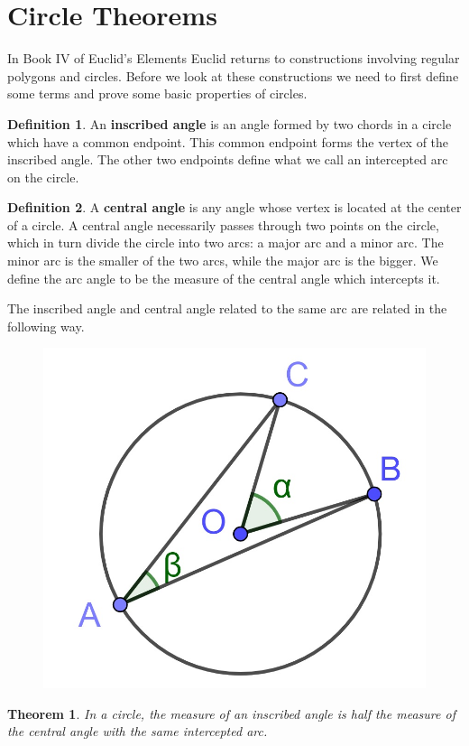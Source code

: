 \documentclass[
]{book}
\newtheorem{theorem}{Theorem}[chapter]
\theoremstyle{definition}
\newtheorem{definition}{Definition}[chapter]
\theoremstyle{definition}
\theoremstyle{definition}
\theoremstyle{definition}
\theoremstyle{remark}
\begin{document}
\hypertarget{circle-theorems}{%
\section{Circle Theorems}\label{circle-theorems}}

In Book IV of Euclid's Elements \citep{Heath1908_2} Euclid returns to constructions involving regular polygons and circles. Before we look at these constructions we need to first define some terms and prove some basic properties of circles.

\begin{definition}
An \textbf{inscribed angle} is an angle formed by two chords in a circle which have a common endpoint. This common endpoint forms the vertex of the inscribed angle. The other two endpoints define what we call an intercepted arc on the circle.
\end{definition}

\begin{definition}
A \textbf{central angle} is any angle whose vertex is located at the center of a circle. A central angle necessarily passes through two points on the circle, which in turn divide the circle into two arcs: a major arc and a minor arc. The minor arc is the smaller of the two arcs, while the major arc is the bigger. We define the arc angle to be the measure of the central angle which intercepts it.
\end{definition}

The inscribed angle and central angle related to the same arc are related in the following way.

\begin{figure}

{\centering \includegraphics[width=0.3\linewidth]{images/ArcAngles} 

}

\end{figure}

\begin{theorem}
In a circle, the measure of an inscribed angle is half the measure of the central angle with the same intercepted arc.
\end{theorem}
\end{document}
